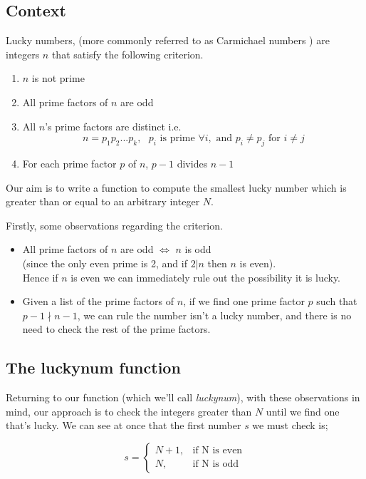 \documentclass[10pt]{article}
\begin{document}
\subsection{Context}
Lucky numbers, (more commonly referred to as Carmichael numbers \cite{carmichael}) are integers $n$ that satisfy the following criterion.

\begin{enumerate}
\item $n$ is not prime
\item All prime factors of $n$ are odd
\item All $n$'s prime factors are distinct i.e. 
$$n=p_1p_2...p_k,\text{     }  p_i \text{ is prime } \forall i, \text{ and } p_i \neq p_j \text{ for } i \neq j$$
\item For each prime factor $p$ of $n$, $p - 1$ divides $n-1$ 
\end{enumerate}

Our aim is to write a function to compute the smallest lucky number which is greater than or equal to an arbitrary integer $N$. 

Firstly, some observations regarding the criterion.

\begin{itemize}

\item All prime factors of $n$ are odd $\iff$ $n$ is odd\\
 (since the only even prime is 2, and if $2|n$ then $n$ is even).\\
 
 Hence if $n$ is even we can immediately rule out the possibility it is lucky.
\item Given a list of the prime factors of $n$, if we find one prime factor $p$ such that $p -1 \nmid n-1$, we can rule the number isn't a lucky number, and there is no need to check the rest of the prime factors.
\end{itemize}

\subsection{The luckynum function}

Returning to our function (which we'll call \emph{luckynum}), with these observations in mind,  our approach is to check the integers greater than $N$ until we find one that's lucky. We can see at once that the first number $s$ we must check is;

$$ s = \begin{cases}
               N + 1,& \text{if N is even}\\
               N, & \text{if N is odd}
            \end{cases}
$$
\end{document}
